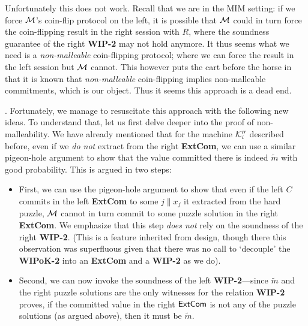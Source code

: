Unfortunately this does not work. Recall that we are in the MIM setting: if we force $\mathcal{M}$'s coin-flip protocol on the left, it is possible that $\mathcal{M}$ could in turn force the coin-flipping result in the right session with $R$, where the soundness guarantee of the right {\bf WIP-2} may not hold anymore. It thus seems what we need is a {\em non-malleable} coin-flipping protocol; where we can force the result in the left session but $\mathcal{M}$ cannot. This however puts the cart before the horse in that it is known that {\em non-malleable} coin-flipping implies non-malleable commitments, which is our object. Thus it seems this approach is a dead end. 

. Fortunately, we manage to resuscitate this approach with the following new ideas. To understand that, let us first delve deeper into the \cite{FOCS:LPY23} proof of non-malleability.  We have already mentioned that for the machine $\mathcal{K}''_i$ described before, even if we {\em do not} extract from the right {\bf ExtCom}, we can use a similar pigeon-hole argument to show that the value committed there is indeed $\tilde{m}$ with good probability. This is argued in two steps:
\begin{itemize}
      \item
      First,  we can use the \cite{FOCS:LPY23} pigeon-hole argument to show that even if the left $C$ commits in the left {\bf ExtCom} to some $j\|x_j$ it extracted from the hard puzzle, $\mathcal{M}$ cannot in turn commit to some puzzle solution in the right {\bf ExtCom}. We emphasize that this step {\em does not} rely on the soundness of the right {\bf WIP-2}. (This is a feature inherited from \cite{FOCS:LPY23} design, though there this observation was superfluous given that there was no call to `decouple' the {\bf WIPoK-2} into an {\bf ExtCom} and a {\bf WIP-2} as we do).
      \item 
      Second, we can now invoke the soundness of the left {\bf WIP-2}---since $\tilde{m}$ and the right puzzle solutions are the only witnesses for the relation {\bf WIP-2} proves, if the committed value in the right $\mathsf{ExtCom}$ is not any of the puzzle solutions (as argued above), then it must be $\tilde{m}$. 
\end{itemize}

